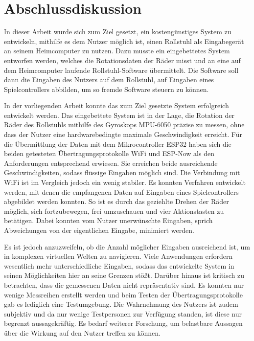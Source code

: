 \chapter{Abschlussdiskussion}
In dieser Arbeit wurde sich zum Ziel gesetzt, ein kostengünstiges System zu entwickeln, mithilfe es dem Nutzer möglich ist, einen Rollstuhl als Eingabegerät an seinem Heimcomputer zu nutzen.
Dazu musste ein eingebettetes System entworfen werden, welches die Rotationsdaten der Räder misst und an eine auf dem Heimcomputer laufende Rollstuhl-Software übermittelt.
Die Software soll dann die Eingaben des Nutzers auf dem Rollstuhl, auf Eingaben eines Spielcontrollers abbilden, um so fremde Software steuern zu können.

In der vorliegenden Arbeit konnte das zum Ziel gesetzte System erfolgreich entwickelt werden.
Das eingebettete System ist in der Lage, die Rotation der Räder des Rollstuhls mithilfe des Gyroskops MPU-6050 präzise zu messen, ohne dass der Nutzer eine hardwarebedingte maximale Geschwindigkeit erreicht.
Für die Übermittlung der Daten mit dem Mikrocontroller ESP32 haben sich die beiden getesteten Übertragungsprotokolle WiFi und ESP-Now als den Anforderungen entsprechend erwiesen.
Sie erreichen beide ausreichende Geschwindigkeiten, sodass flüssige Eingaben möglich sind.
Die Verbindung mit WiFi ist im Vergleich jedoch ein wenig stabiler.
Es konnten Verfahren entwickelt werden, mit denen die empfangenen Daten auf Eingaben eines Spielcontrollers abgebildet werden konnten.
So ist es durch das geziehlte Drehen der Räder möglich, sich fortzubewegen, frei umzuschauen und vier Aktionstasten zu betätigen.
Dabei konnten vom Nutzer unerwünschte Eingaben, sprich Abweichungen von der eigentlichen Eingabe, minimiert werden.

Es ist jedoch anzuzweifeln, ob die Anzahl möglicher Eingaben ausreichend ist, um in komplexen virtuellen Welten zu navigieren.
Viele Anwendungen erfordern wesentlich mehr unterschiedliche Eingaben, sodass das entwickelte System in seinen Möglichkeiten hier an seine Grenzen stößt.
Darüber hinaus ist kritisch zu betrachten, dass die gemessenen Daten nicht repräsentativ sind.
Es konnten nur wenige Messreihen erstellt werden und beim Testen der Übertragungsprotokolle gab es lediglich eine Testumgebung.
Die Wahrnehmung des Nutzers ist zudem subjektiv und da nur wenige Testpersonen zur Verfügung standen, ist diese nur begrenzt aussagekräftig.
Es bedarf weiterer Forschung, um belastbare Aussagen über die Wirkung auf den Nutzer treffen zu können.

